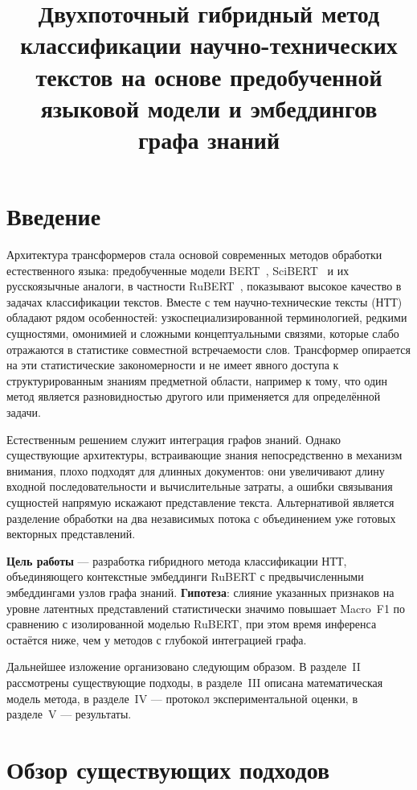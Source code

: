 \documentclass{misisarticle}
\title{Двухпоточный гибридный метод классификации научно-технических текстов на основе предобученной языковой модели и эмбеддингов графа знаний}
\begin{document}
\maketitle

\section{Введение}
Архитектура трансформеров стала основой современных методов обработки естественного языка: предобученные модели BERT~\cite{devlin}, SciBERT~\cite{scibert} и их русскоязычные аналоги, в частности RuBERT~\cite{kuratov}, показывают высокое качество в задачах классификации текстов. Вместе с тем научно-технические тексты (НТТ) обладают рядом особенностей: узкоспециализированной терминологией, редкими сущностями, омонимией и сложными концептуальными связями, которые слабо отражаются в статистике совместной встречаемости слов. Трансформер опирается на эти статистические закономерности и не имеет явного доступа к структурированным знаниям предметной области, например к тому, что один метод является разновидностью другого или применяется для определённой задачи.

Естественным решением служит интеграция графов знаний. Однако существующие архитектуры, встраивающие знания непосредственно в механизм внимания, плохо подходят для длинных документов: они увеличивают длину входной последовательности и вычислительные затраты, а ошибки связывания сущностей напрямую искажают представление текста. Альтернативой является разделение обработки на два независимых потока с объединением уже готовых векторных представлений.

\textbf{Цель работы} --- разработка гибридного метода классификации НТТ, объединяющего контекстные эмбеддинги RuBERT с предвычисленными эмбеддингами узлов графа знаний. \textbf{Гипотеза}: слияние указанных признаков на уровне латентных представлений статистически значимо повышает Macro~F1 по сравнению с изолированной моделью RuBERT, при этом время инференса остаётся ниже, чем у методов с глубокой интеграцией графа.

Дальнейшее изложение организовано следующим образом. В разделе~II рассмотрены существующие подходы, в разделе~III описана математическая модель метода, в разделе~IV --- протокол экспериментальной оценки, в разделе~V --- результаты.

\section{Обзор существующих подходов}
\end{document}
